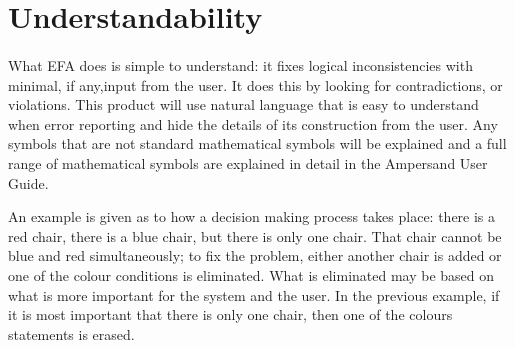 \documentclass[12pt]{report}
\begin{document}
\section{Understandability}
\paragraph*{}
What EFA does is simple to understand: it fixes logical inconsistencies with 
minimal, if any,input from the user. It does this by looking for 
contradictions, or violations. This product will use natural language that is 
easy to understand when error reporting and hide the details of its 
construction from the user. Any symbols that are not standard mathematical 
symbols will be explained and a full range of mathematical symbols are 
explained in detail in the Ampersand User Guide. 

An example is given as to how a decision making process takes place: there is a 
red chair, there is a blue chair, but there is only one chair. That chair 
cannot be blue and red simultaneously; to fix the problem, either another chair 
is added or one of the colour conditions is eliminated. What is eliminated may 
be based on what is more important for the system and the user. In the previous 
example, if it is most important that there is only one chair, then one of the 
colours statements is erased. 
\end{document}
